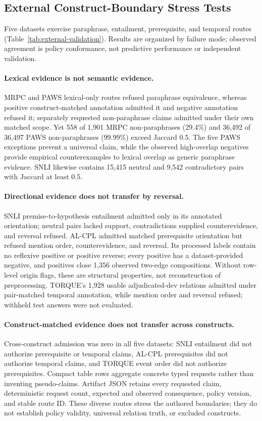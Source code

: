 \documentclass[manuscript,screen,review,anonymous]{acmart}
\begin{document}
\subsection{External Construct-Boundary Stress Tests}

Five datasets exercise paraphrase, entailment, prerequisite, and temporal routes (Table~\ref{tab:external-validation}). Results are organized by failure mode; observed agreement is policy conformance, not predictive performance or independent validation.

\paragraph{Lexical evidence is not semantic evidence.} MRPC and PAWS lexical-only routes refused paraphrase equivalence, whereas positive construct-matched annotation admitted it and negative annotation refused it; separately requested non-paraphrase claims admitted under their own matched scope. Yet 558 of 1,901 MRPC non-paraphrases (29.4\%) and 36,492 of 36,497 PAWS non-paraphrases (99.99\%) exceed Jaccard 0.5. The five PAWS exceptions prevent a universal claim, while the observed high-overlap negatives provide empirical counterexamples to lexical overlap as generic paraphrase evidence. SNLI likewise contains 15,415 neutral and 9,542 contradictory pairs with Jaccard at least 0.5.

\paragraph{Directional evidence does not transfer by reversal.} SNLI premise-to-hypothesis entailment admitted only in its annotated orientation; neutral pairs lacked support, contradictions supplied counterevidence, and reversal refused. AL-CPL admitted matched prerequisite orientation but refused mention order, counterevidence, and reversal. Its processed labels contain no reflexive positive or positive reverse; every positive has a dataset-provided negative, and positives close 1,356 observed two-edge compositions. Without row-level origin flags, these are structural properties, not reconstruction of preprocessing. TORQUE's 1,928 usable adjudicated-dev relations admitted under pair-matched temporal annotation, while mention order and reversal refused; withheld test answers were not evaluated.

\paragraph{Construct-matched evidence does not transfer across constructs.} Cross-construct admission was zero in all five datasets: SNLI entailment did not authorize prerequisite or temporal claims, AL-CPL prerequisites did not authorize temporal claims, and TORQUE event order did not authorize prerequisites. Compact table rows aggregate concrete typed requests rather than inventing pseudo-claims. Artifact JSON retains every requested claim, deterministic request count, expected and observed consequence, policy version, and stable route ID. These diverse routes stress the authored boundaries; they do not establish policy validity, universal relation truth, or excluded constructs.
\end{document}
